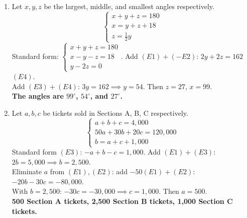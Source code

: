 \documentclass{ximera}
\begin{document}
\begin{problem}
\begin{solution}
\begin{enumerate}
  \item[(b)] Let $x, y, z$ be the largest, middle, and smallest angles respectively.
  $$\begin{cases} x+y+z=180 \\ x=y+z+18 \\ z=\frac{1}{2}y \end{cases}$$
  Standard form: $\begin{cases} x+y+z=180 \\ x-y-z=18 \\ y-2z=0 \end{cases}$. Add $(E1)+(-E2)$: $2y+2z=162$ $(E4)$.\\
  Add $(E3)+(E4)$: $3y=162 \implies y=54$. Then $z=27$, $x=99$.\\
  \textbf{The angles are $99^\circ$, $54^\circ$, and $27^\circ$.}

  \item[(c)] Let $a, b, c$ be tickets sold in Sections A, B, C respectively.
  $$\begin{cases} a+b+c=4{,}000 \\ 50a+30b+20c=120{,}000 \\ b=a+c+1{,}000 \end{cases}$$
  Standard form $(E3)$: $-a+b-c=1{,}000$. Add $(E1)+(E3)$: $2b=5{,}000 \implies b=2{,}500$.\\
  Eliminate $a$ from $(E1),(E2)$: add $-50(E1)+(E2)$: $-20b-30c=-80{,}000$.\\
  With $b=2{,}500$: $-30c=-30{,}000 \implies c=1{,}000$. Then $a=500$.\\
  \textbf{500 Section A tickets, 2,500 Section B tickets, 1,000 Section C tickets.}
\end{enumerate}
\end{solution}
\end{problem}
\end{document}
